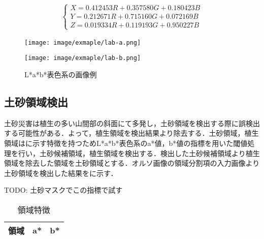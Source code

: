       \begin{eqnarray}
        \label{XYZ表色系}
        \left\{
          \begin{array}{l}
            X = 0.412453R + 0.357580G + 0.180423B \\
            Y = 0.212671R + 0.715160G + 0.072169B \\
            Z = 0.019334R + 0.119193G + 0.950227B
          \end{array}
        \right.
      \end{eqnarray}
      
      \begin{figure}[t]
        \begin{minipage}[c]{0.45\hsize}
          \centering
          \texttt{[image: image/exmaple/lab-a.png]}
        \end{minipage}
        \begin{minipage}[c]{0.45\hsize}
          \centering
          \texttt{[image: image/exmaple/lab-b.png]}
        \end{minipage}
        \caption{L*a*b*表色系の画像例}
        \label{Lab画像}
      \end{figure}

    \subsection{土砂領域検出}
      土砂災害は植生の多い山間部の斜面にて多発し，土砂領域を検出する際に誤検出する可能性がある．よって，植生領域を検出結果より除去する．土砂領域，植生領域はに示す特徴を持つためL*a*b*表色系のa*値，b*値の指標を用いた閾値処理を行い，土砂候補領域，植生領域を検出する．検出した土砂候補領域より植生領域を除去した領域を土砂領域とする．{オルソ画像の領域分割}項の入力画像より土砂領域を検出した結果をに示す．

    TODO: 土砂マスクでこの指標で試す

    \begin{table}[b]
      \centering
      \caption{領域特徴}
      \label{領域特徴}
      \begin{tabular}{ccc}
        \hline
        領域 & a* & b* \\ \hline
      \end{tabular}
    \end{table}
    
